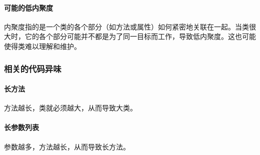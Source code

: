 \paragraph{可能的低内聚度}内聚度指的是一个类的各个部分（如方法或属性）如何紧密地关联在一起。当类很大时，它的各个部分可能并不都是为了同一目标而工作，导致低内聚度。这也可能使得类难以理解和维护。

\subsubsection{相关的代码异味}
\paragraph{长方法}方法越长，类就必须越大，从而导致大类。
\paragraph{长参数列表}参数越多，方法越长，从而导致长方法。































